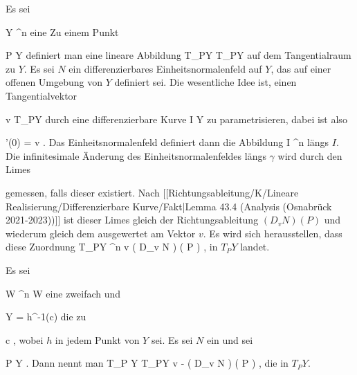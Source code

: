\setcounter{section}{4}


Es sei

\mavergleichskette
{\vergleichskette
{ Y
}
{ \subseteq }{ \R^n
}
{  }{
}
{    }{
}
{   }{
}
}
{}{}{}
eine
Zu einem Punkt

\mavergleichskette
{\vergleichskette
{ P
}
{ \in }{ Y
}
{  }{
}
{    }{
}
{   }{
}
}
{}{}{}
definiert man eine lineare Abbildung
 { T_PY } { T_PY
} {}
auf dem Tangentialraum zu $Y$. Es sei $N$ ein differenzierbares Einheitsnormalenfeld auf $Y$, das auf einer offenen Umgebung von $Y$ definiert sei. Die wesentliche Idee ist, einen Tangentialvektor

\mavergleichskette
{\vergleichskette
{ v
}
{ \in }{ T_PY
}
{  }{
}
{    }{
}
{   }{
}
}
{}{}{}
durch eine differenzierbare Kurve
\maabbdisp {\gamma} { I } { Y
} {}
zu parametrisieren, dabei ist also

\mavergleichskettedisp
{\vergleichskette
{ \gamma'(0)
}
{ =} { v
}
{ } {
}
{ } {
}
{ } {
}
}
{}{}{.}
Das Einheitsnormalenfeld definiert dann die Abbildung
 { I } { \R^n
} {}
längs $I$. Die infinitesimale Änderung des Einheitsnormalenfeldes längs $\gamma$ wird durch den Limes

 {  }

gemessen, falls dieser existiert. Nach
[[Richtungsableitung/K/Lineare Realisierung/Differenzierbare Kurve/Fakt|Lemma 43.4 (Analysis (Osnabrück 2021-2023))]]
ist dieser Limes gleich der Richtungsableitung $\left(  D_{ v }  N   \right) \left(   P   \right)$ und wiederum gleich
 dem
ausgewertet am Vektor $v$. Es wird sich herausstellen, dass diese Zuordnung
\maabbeledisp {} { T_PY } { \R^n
} {v } { \left(  D_{v}  N   \right) \left(   P   \right)
} {,}
in $T_PY$ landet.

{}
{

Es sei

\mavergleichskette
{\vergleichskette
{ W
}
{ \subseteq }{ \R^n
}
{  }{
}
{    }{
}
{   }{
}
}
{}{}{}
 { W } { \R
} {}
eine zweifach
und

\mavergleichskette
{\vergleichskette
{ Y
}
{ = }{ h^{-1}(c)
}
{  }{
}
{    }{
}
{   }{
}
}
{}{}{}
die
zu

\mavergleichskette
{\vergleichskette
{ c
}
{ \in }{ \R
}
{  }{
}
{    }{
}
{   }{
}
}
{}{}{,}
wobei $h$ in jedem Punkt von $Y$
sei. Es sei $N$ ein
und sei

\mavergleichskette
{\vergleichskette
{ P
}
{ \in }{ Y
}
{  }{
}
{    }{
}
{   }{
}
}
{}{}{.}
Dann nennt man
 {T_P Y} { T_PY
} { v } { - \left(  D_{v}  N   \right) \left(   P  \right)
} {,}
die
in $T_PY$.

}

